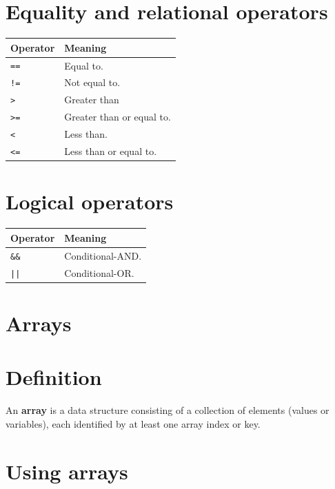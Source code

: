 \documentclass[a4paper]{systems-software}
\begin{document}
\section*{Equality and relational operators}

\begin{longtabu} to \textwidth {| X[0.15,l] | X[1,l] |}
	\hline
	\textbf{Operator} & \textbf{Meaning}
	\\ \hline
	\texttt{==} & Equal to.
	\\ \hline
	\texttt{!=} & Not equal to.
	\\ \hline
	\texttt{>} & Greater than
	\\ \hline
	\texttt{>=} & Greater than or equal to.
	\\ \hline
	\texttt{<} & Less than.
	\\ \hline
	\texttt{<=} & Less than or equal to.
	\\ \hline
\end{longtabu}


\section*{Logical operators}

\begin{longtabu} to \textwidth {| X[0.15,l] | X[1,l] |}
	\hline
	\textbf{Operator} & \textbf{Meaning}
	\\ \hline
	\texttt{\&\&} & Conditional-AND.
	\\ \hline
	\texttt{||} & Conditional-OR.
	\\ \hline
\end{longtabu}


\newpage

\section{Arrays}

\section*{Definition}

An \textbf{array} is a data structure consisting of a collection of elements (values or variables), each identified by at least one array index or key.


\section*{Using arrays}
\end{document}

